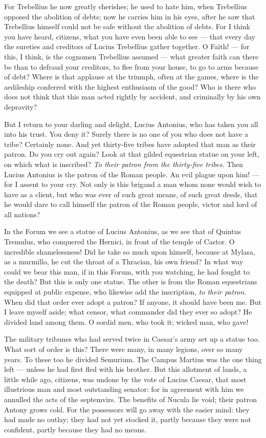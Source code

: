  For Trebellius he now greatly cherishes; he used to hate him, when Trebellius opposed the abolition of debts; now he carries him in his eyes, after he saw that Trebellius himself could not be safe without the abolition of debts. For I think you have heard, citizens, what you have even been able to see --- that every day the sureties and creditors of Lucius Trebellius gather together. O Faith! --- for this, I think, is the cognomen Trebellius assumed --- what greater faith can there be than to defraud your creditors, to flee from your house, to go to arms because of debt? Where is that applause at the triumph, often at the games, where is the aedileship conferred with the highest enthusiasm of the good? Who is there who does not think that this man acted rightly by accident, and criminally by his own depravity?

 But I return to your darling and delight, Lucius Antonius, who has taken you all into his trust. You deny it? Surely there is no one of you who does not have a tribe? Certainly none. And yet thirty-five tribes have adopted that man as their patron. Do you cry out again? Look at that gilded equestrian statue on your left, on which what is inscribed? \textit{To their patron from the thirty-five tribes.} Then Lucius Antonius is the patron of the Roman people. An evil plague upon him! --- for I assent to your cry. Not only is this brigand a man whom none would wish to have as a client, but who was ever of such great means, of such great deeds, that he would dare to call himself the patron of the Roman people, victor and lord of all nations?

 In the Forum we see a statue of Lucius Antonius, as we see that of Quintus Tremulus, who conquered the Hernici, in front of the temple of Castor. O incredible shamelessness! Did he take so much upon himself, because at Mylasa, as a murmillo, he cut the throat of a Thracian, his own friend? In what way could we bear this man, if in this Forum, with you watching, he had fought to the death? But this is only one statue. The other is from the Roman equestrians equipped at public expense, who likewise add the inscription, \textit{to their patron.} When did that order ever adopt a patron? If anyone, it should have been me. But I leave myself aside; what censor, what commander did they ever so adopt? He divided land among them. O sordid men, who took it; wicked man, who gave!

 The military tribunes who had served twice in Caesar's army set up a statue too. What sort of order is this? There were many, in many legions, over so many years. To these too he divided Semurium. The Campus Martius was the one thing left --- unless he had first fled with his brother. But this allotment of lands, a little while ago, citizens, was undone by the vote of Lucius Caesar, that most illustrious man and most outstanding senator: for in agreement with him we annulled the acts of the septemvirs. The benefits of Nucula lie void; their patron Antony grows cold. For the possessors will go away with the easier mind: they had made no outlay; they had not yet stocked it, partly because they were not confident, partly because they had no means.

